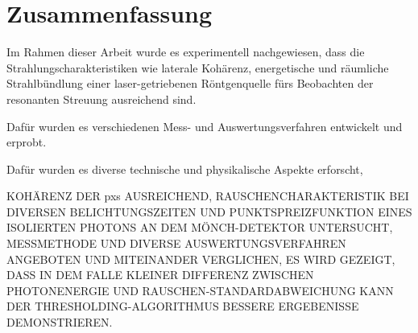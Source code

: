 \chapter{Zusammenfassung}
Im Rahmen dieser Arbeit wurde es experimentell nachgewiesen, dass die Strahlungscharakteristiken wie laterale Kohärenz, energetische und räumliche Strahlbündlung einer laser-getriebenen Röntgenquelle fürs Beobachten der resonanten Streuung ausreichend sind.
\begin{figure}[H]
    \centering
    
    \label{fig:summary_ring_no_ring}
\end{figure}
\noindent
Dafür wurden es verschiedenen Mess- und Auswertungsverfahren entwickelt und erprobt. 

Dafür wurden es diverse technische und physikalische Aspekte erforscht, 



KOHÄRENZ DER \gls{pxs} AUSREICHEND, RAUSCHENCHARAKTERISTIK BEI DIVERSEN BELICHTUNGSZEITEN UND PUNKTSPREIZFUNKTION EINES ISOLIERTEN PHOTONS AN DEM MÖNCH-DETEKTOR UNTERSUCHT, MESSMETHODE UND DIVERSE AUSWERTUNGSVERFAHREN ANGEBOTEN UND MITEINANDER VERGLICHEN, ES WIRD GEZEIGT, DASS IN DEM FALLE KLEINER DIFFERENZ ZWISCHEN PHOTONENERGIE UND RAUSCHEN-STANDARDABWEICHUNG KANN DER THRESHOLDING-ALGORITHMUS BESSERE ERGEBENISSE DEMONSTRIEREN.